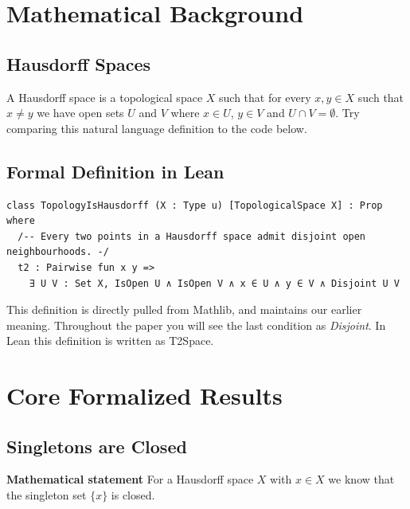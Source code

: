 \documentclass[11pt]{article}
\begin{document}
\section{Mathematical Background}

\subsection{Hausdorff Spaces}

A Hausdorff space is a topological space $X$ such that for every $x, y \in X$ such that $x \not = y$ we have open sets $U$ and $V$ where $x \in U$, $y \in V$ and $U \cap V = \emptyset$. Try comparing this natural language definition to the code below. 

\subsection{Formal Definition in Lean}

\begin{verbatim}
class TopologyIsHausdorff (X : Type u) [TopologicalSpace X] : Prop where
  /-- Every two points in a Hausdorff space admit disjoint open neighbourhoods. -/
  t2 : Pairwise fun x y =>
    ∃ U V : Set X, IsOpen U ∧ IsOpen V ∧ x ∈ U ∧ y ∈ V ∧ Disjoint U V
\end{verbatim}


This definition is directly pulled from Mathlib, and maintains our earlier meaning. Throughout the paper you will see the last condition as \emph{Disjoint}. In Lean this definition is written as T2Space. 

\section{Core Formalized Results}

\subsection{Singletons are Closed}

\textbf{Mathematical statement} 
For a Hausdorff space $X$ with $x \in X$ we know that the singleton set $\{x\}$ is closed. 
\end{document}
